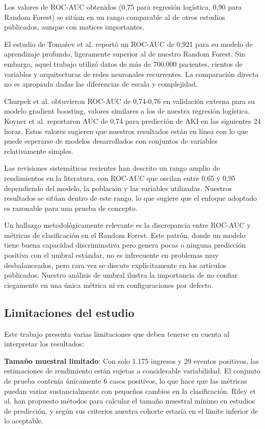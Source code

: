 \documentclass[12pt, a4paper, oneside]{report}
\begin{document}
Los valores de ROC-AUC obtenidos (0,75 para regresión logística, 0,90 para Random Forest) se sitúan en un rango comparable al de otros estudios publicados, aunque con matices importantes.

El estudio de Tomašev et al. \cite{tomasev2019nature} reportó un ROC-AUC de 0,921 para su modelo de aprendizaje profundo, ligeramente superior al de nuestro Random Forest. Sin embargo, aquel trabajo utilizó datos de más de 700.000 pacientes, cientos de variables y arquitecturas de redes neuronales recurrentes. La comparación directa no es apropiada dadas las diferencias de escala y complejidad.

Churpek et al. \cite{churpek2020jama} obtuvieron ROC-AUC de 0,74-0,76 en validación externa para su modelo gradient boosting, valores similares a los de nuestra regresión logística. Koyner et al. \cite{koyner2018ccm} reportaron AUC de 0,74 para predicción de AKI en las siguientes 24 horas. Estos valores sugieren que nuestros resultados están en línea con lo que puede esperarse de modelos desarrollados con conjuntos de variables relativamente simples.

Las revisiones sistemáticas recientes \cite{rank2022systematic, shi2025jamia, zhao2024systematic} han descrito un rango amplio de rendimientos en la literatura, con ROC-AUC que oscilan entre 0,65 y 0,95 dependiendo del modelo, la población y las variables utilizadas. Nuestros resultados se sitúan dentro de este rango, lo que sugiere que el enfoque adoptado es razonable para una prueba de concepto.

Un hallazgo metodológicamente relevante es la discrepancia entre ROC-AUC y métricas de clasificación en el Random Forest. Este patrón, donde un modelo tiene buena capacidad discriminativa pero genera pocas o ninguna predicción positiva con el umbral estándar, no es infrecuente en problemas muy desbalanceados, pero rara vez se discute explícitamente en los artículos publicados. Nuestro análisis de umbral ilustra la importancia de no confiar ciegamente en una única métrica ni en configuraciones por defecto.

\subsection{Limitaciones del estudio}

Este trabajo presenta varias limitaciones que deben tenerse en cuenta al interpretar los resultados:

\textbf{Tamaño muestral limitado}: Con solo 1.175 ingresos y 29 eventos positivos, las estimaciones de rendimiento están sujetas a considerable variabilidad. El conjunto de prueba contenía únicamente 6 casos positivos, lo que hace que las métricas puedan variar sustancialmente con pequeños cambios en la clasificación. Riley et al. \cite{riley2020minimum} han propuesto métodos para calcular el tamaño muestral mínimo en estudios de predicción, y según sus criterios nuestra cohorte estaría en el límite inferior de lo aceptable.
\end{document}
